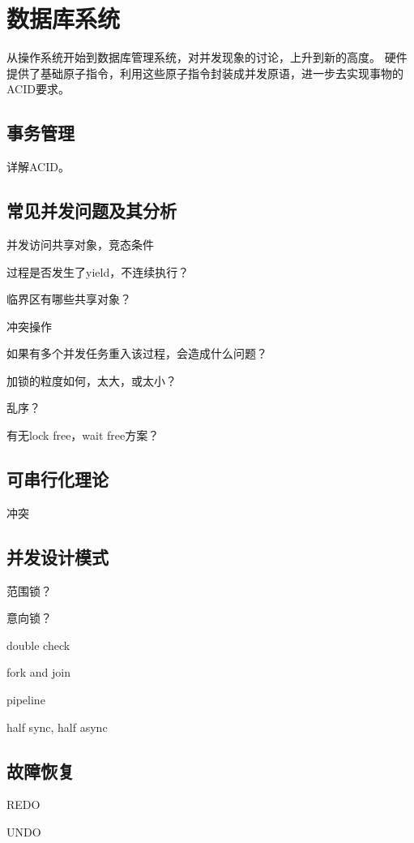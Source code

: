 \chapter{数据库系统}

从操作系统开始到数据库管理系统，对并发现象的讨论，上升到新的高度。
硬件提供了基础原子指令，利用这些原子指令封装成并发原语，进一步去实现事物的ACID要求。

\section{事务管理}

详解ACID。

\section{常见并发问题及其分析}

并发访问共享对象，竞态条件

\begin{enumbox}
\item 过程是否发生了yield，不连续执行？
\item 临界区有哪些共享对象？
\item 冲突操作
\item 如果有多个并发任务重入该过程，会造成什么问题？
\item 加锁的粒度如何，太大，或太小？
\item 乱序？
\item 有无lock free，wait free方案？
\end{enumbox}

\section{可串行化理论}

冲突

\section{并发设计模式}

范围锁？

意向锁？

\begin{compactitem}
    \item double check
    \item fork and join
    \item pipeline
    \item half sync, half async
\end{compactitem}

\section{故障恢复}

REDO

UNDO
